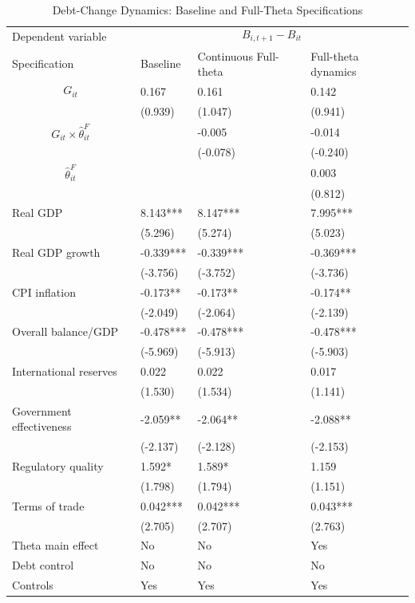 \begin{table}[H]\centering
\begin{threeparttable}
\caption{Debt-Change Dynamics: Baseline and Full-Theta Specifications}
\label{tab:debt_change_combined_fulltheta}
\scriptsize
\begin{tabularx}{\textwidth}{lYYY}
\toprule
Dependent variable &  \\
\cmidrule(lr){2-4}
Specification & Baseline & Continuous Full-theta & Full-theta dynamics \\
\midrule
$$G_{it}$$ & 0.167 & 0.161 & 0.142 \\
 & (0.939) & (1.047) & (0.941) \\
$$G_{it}\times\widehat{\theta}^{F}_{it}$$ &  & -0.005 & -0.014 \\
 &  & (-0.078) & (-0.240) \\
$$\widehat{\theta}^{F}_{it}$$ &  &  & 0.003 \\
 &  &  & (0.812) \\
Real GDP & 8.143*** & 8.147*** & 7.995*** \\
 & (5.296) & (5.274) & (5.023) \\
Real GDP growth & -0.339*** & -0.339*** & -0.369*** \\
 & (-3.756) & (-3.752) & (-3.736) \\
CPI inflation & -0.173** & -0.173** & -0.174** \\
 & (-2.049) & (-2.064) & (-2.139) \\
Overall balance/GDP & -0.478*** & -0.478*** & -0.478*** \\
 & (-5.969) & (-5.913) & (-5.903) \\
International reserves & 0.022 & 0.022 & 0.017 \\
 & (1.530) & (1.534) & (1.141) \\
Government effectiveness & -2.059** & -2.064** & -2.088** \\
 & (-2.137) & (-2.128) & (-2.153) \\
Regulatory quality & 1.592* & 1.589* & 1.159 \\
 & (1.798) & (1.794) & (1.151) \\
Terms of trade & 0.042*** & 0.042*** & 0.043*** \\
 & (2.705) & (2.707) & (2.763) \\
\midrule
Theta main effect & No & No & Yes \\
Debt control & No & No & No \\
Controls & Yes & Yes & Yes \\

\end{tabularx}
\end{threeparttable}
\end{table}
